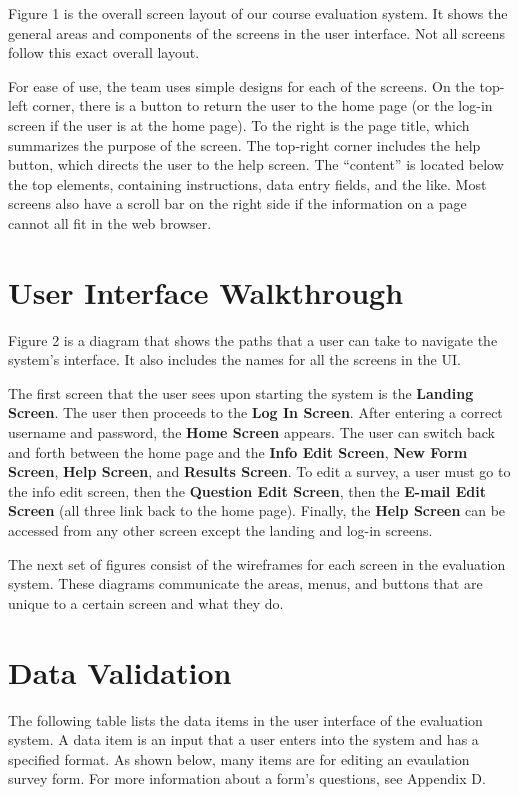 \documentclass{article}
\begin{document}
Figure 1 is the overall screen layout of our course evaluation system. It shows the general areas and components of the screens in the user interface. Not all screens follow this exact overall layout.

For ease of use, the team uses simple designs for each of the screens. On the top-left corner, there is a button to return the user to the home page (or the log-in screen if the user is at the home page). To the right is the page title, which summarizes the purpose of the screen. The top-right corner includes the help button, which directs the user to the help screen. The ``content'' is located below the top elements, containing instructions, data entry fields, and the like. Most screens also have a scroll bar on the right side if the information on a page cannot all fit in the web browser.

\section{User Interface Walkthrough}

Figure 2 is a diagram that shows the paths that a user can take to navigate the system's interface. It also includes the names for all the screens in the UI.

The first screen that the user sees upon starting the system is the \textbf{Landing Screen}. The user then proceeds to the \textbf{Log In Screen}. After entering a correct username and password, the \textbf{Home Screen} appears. The user can switch back and forth between the home page and the \textbf{Info Edit Screen}, \textbf{New Form Screen}, \textbf{Help Screen}, and \textbf{Results Screen}. To edit a survey, a user must go to the info edit screen, then the \textbf{Question Edit Screen}, then the \textbf{E-mail Edit Screen} (all three link back to the home page). Finally, the \textbf{Help Screen} can be accessed from any other screen except the landing and log-in screens.

The next set of figures consist of the wireframes for each screen in the evaluation system. These diagrams communicate the areas, menus, and buttons that are unique to a certain screen and what they do.


\section{Data Validation}

The following table lists the data items in the user interface of the evaluation system. A data item is an input that a user enters into the system and has a specified format. As shown below, many items are for editing an evaulation survey form. For more information about a form's questions, see Appendix D.
\end{document}
